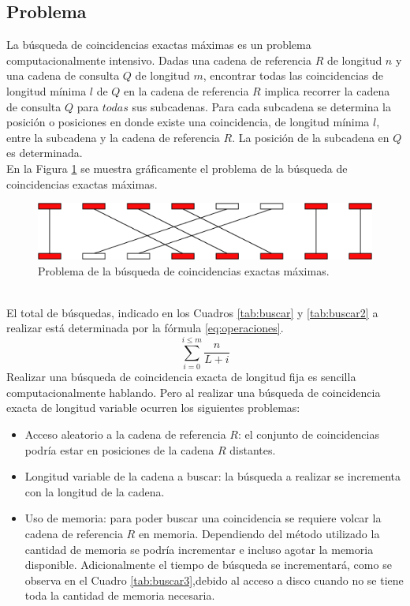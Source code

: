 \documentclass[12pt,a4paper]{article}
\begin{document}
\subsection*{Problema}
\indent
La búsqueda de coincidencias exactas máximas es un problema computacionalmente
intensivo. Dadas una cadena de referencia $R$ de longitud $n$ y una cadena de consulta 
$Q$ de longitud $m$, encontrar todas las coincidencias de longitud mínima $l$ de $Q$
en la cadena de referencia $R$ implica recorrer la cadena de consulta $Q$ para $todas$
sus subcadenas. Para cada subcadena se determina la posición o posiciones en donde 
existe una coincidencia, de longitud mínima $l$, entre la subcadena y la cadena de 
referencia $R$. La posición de la subcadena en $Q$ es determinada.\\
\indent
En la Figura \ref{fig:problema} se muestra gráficamente el problema de la búsqueda
de coincidencias exactas máximas.
\begin{figure}[h]
\begin{center}
\includegraphics[scale=0.5]{gaps.png}
\caption{Problema de la búsqueda de coincidencias exactas máximas.}
\label{fig:problema}
\end{center}
\end{figure}
\\ \indent El total de búsquedas, indicado en los Cuadros \ref{tab:buscar} y \ref{tab:buscar2} 
a realizar está determinada por la fórmula \ref{eq:operaciones}.
\begin{equation}
  \sum_{i=0}^{i\le m}{\frac{n}{L+i}}
  \label{eq:operaciones}
\end{equation}
Realizar una búsqueda de coincidencia exacta de longitud fija es sencilla 
computacionalmente hablando. Pero al realizar una búsqueda de coincidencia exacta de 
longitud variable ocurren los siguientes problemas:
\begin{itemize}
  \item Acceso aleatorio a la cadena de referencia $R$: el conjunto de coincidencias
    podría estar en posiciones de la cadena $R$ distantes.
  \item Longitud variable de la cadena a buscar: la búsqueda a realizar se incrementa
    con la longitud de la cadena.
  \item Uso de memoria: para poder buscar una coincidencia se requiere volcar la 
    cadena de referencia $R$ en memoria. Dependiendo del método utilizado la 
    cantidad de memoria se podría incrementar e incluso agotar la memoria disponible.
    Adicionalmente el tiempo de búsqueda se incrementará, como se observa en el 
    Cuadro \ref{tab:buscar3},debido al acceso a disco cuando no se tiene toda la 
    cantidad de memoria necesaria.
\end{itemize}
\end{document}
